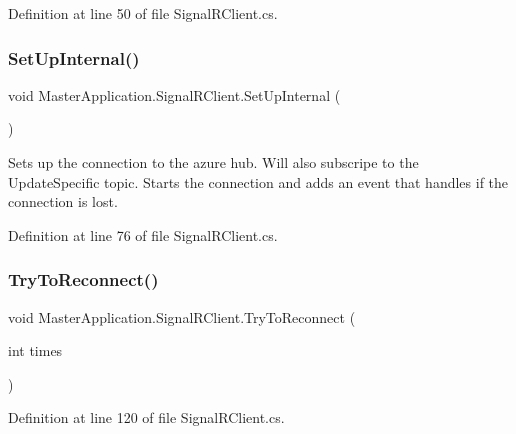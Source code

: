 Definition at line 50 of file Signal\+R\+Client.\+cs.

\mbox{\label{class_master_application_1_1_signal_r_client_a092a3b2db4b336cbe6ef675ac614fddd}} 
\subsubsection{\texorpdfstring{Set\+Up\+Internal()}{SetUpInternal()}}
{\footnotesize\ttfamily void Master\+Application.\+Signal\+R\+Client.\+Set\+Up\+Internal (\begin{DoxyParamCaption}{ }\end{DoxyParamCaption})\hspace{0.3cm}{\ttfamily [private]}}

Sets up the connection to the azure hub. Will also subscripe to the Update\+Specific topic. Starts the connection and adds an event that handles if the connection is lost. 

Definition at line 76 of file Signal\+R\+Client.\+cs.

\mbox{\label{class_master_application_1_1_signal_r_client_a1bc49180200db122a1a8b4079d2be1c0}} 
\subsubsection{\texorpdfstring{Try\+To\+Reconnect()}{TryToReconnect()}}
{\footnotesize\ttfamily void Master\+Application.\+Signal\+R\+Client.\+Try\+To\+Reconnect (\begin{DoxyParamCaption}\item[{int}]{times }\end{DoxyParamCaption})\hspace{0.3cm}{\ttfamily [private]}}



Definition at line 120 of file Signal\+R\+Client.\+cs.


